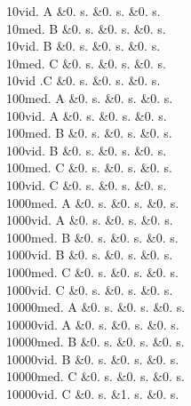 \begin{DoxyItemize}
\begin{longtabu}
10vid. A  &0. s.  &0. s.  &0. s.   \\
10med. B  &0. s.  &0. s.  &0. s.   \\
10vid. B  &0. s.  &0. s.  &0. s.   \\
10med. C  &0. s.  &0. s.  &0. s.   \\
10vid .C  &0. s.  &0. s.  &0. s.   \\
100med. A  &0. s.  &0. s.  &0. s.   \\
100vid. A  &0. s.  &0. s.  &0. s.   \\
100med. B  &0. s.  &0. s.  &0. s.   \\
100vid. B  &0. s.  &0. s.  &0. s.   \\
100med. C  &0. s.  &0. s.  &0. s.   \\
100vid. C  &0. s.  &0. s.  &0. s.   \\
1000med. A  &0. s.  &0. s.  &0. s.   \\
1000vid. A  &0. s.  &0. s.  &0. s.   \\
1000med. B  &0. s.  &0. s.  &0. s.   \\
1000vid. B  &0. s.  &0. s.  &0. s.   \\
1000med. C  &0. s.  &0. s.  &0. s.   \\
1000vid. C  &0. s.  &0. s.  &0. s.   \\
10000med. A  &0. s.  &0. s.  &0. s.   \\
10000vid. A  &0. s.  &0. s.  &0. s.   \\
10000med. B  &0. s.  &0. s.  &0. s.   \\
10000vid. B  &0. s.  &0. s.  &0. s.   \\
10000med. C  &0. s.  &0. s.  &0. s.   \\
10000vid. C  &0. s.  &1. s.  &0. s.   \\

\end{longtabu}
\end{DoxyItemize}
